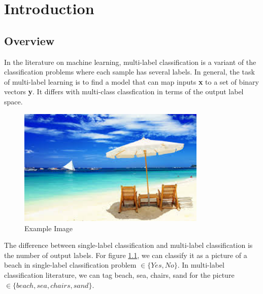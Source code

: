 
\chapter{Introduction} %
\label{Chapter5}

\section{Overview}

In the literature on machine learning, multi-label classification is a variant of the classification problems where each sample has several labels. In general, the task of multi-label learning is to find a model that can map inputs \textbf{x} to a set of binary vectors \textbf{y}. It differs with multi-class classfication in terms of the output label space.

\graphicspath{ {./Figures/} }
\begin{figure}[!htb]
    \centering
	\includegraphics[width=0.8\textwidth]{beach.jpg}
    \caption{Example Image}%
    \label{fig:MultilableImage}%
\end{figure}

The difference between single-label classification and multi-label classification is the number of output labels. For figure \ref{fig:MultilableImage}, we can classify it as a picture of a beach in single-label classification problem $\in \{Yes, No\}$. In multi-label classification literature, we can tag beach, sea, chairs, sand for the picture $\in \{beach, sea, chairs, sand\}$.

